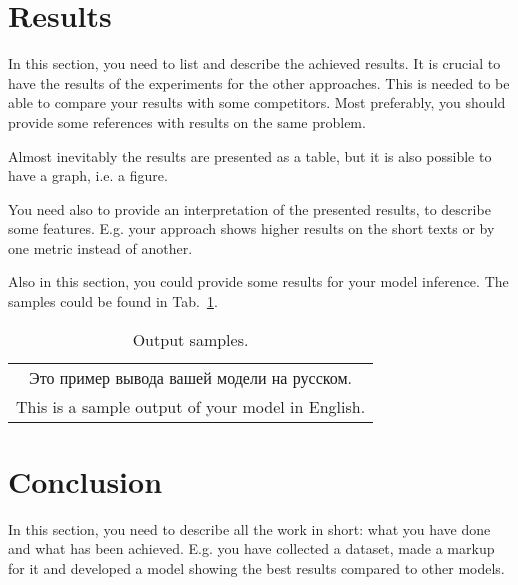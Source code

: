 \documentclass{article}
\begin{document}
\section{Results}
In this section, you need to list and describe the achieved results. It is crucial to have the results of the experiments for the other approaches. This is needed to be able to compare your results with some competitors. Most preferably, you should provide some references with results on the same problem.

Almost inevitably the results are presented as a table, but it is also possible to have a graph, i.e. a figure.

You need also to provide an interpretation of the presented results, to describe some features. E.g. your approach shows higher results on the short texts or by one metric instead of another.

Also in this section, you could provide some results for your model inference. The samples could be found in Tab.~\ref{tab:output}.

\begin{table}[!tbh]
    \centering
    \begin{tabular}{|c|}
\hline
Это пример вывода вашей модели на русском.\\
This is a sample output of your model in English.
\\
\hline
    \end{tabular}
    \caption{Output samples.}
    \label{tab:output}
\end{table}

\section{Conclusion}
In this section, you need to describe all the work in short: what you have done and what has been achieved. E.g. you have collected a dataset, made a markup for it and developed a model showing the best results compared to other models.



\end{document}
